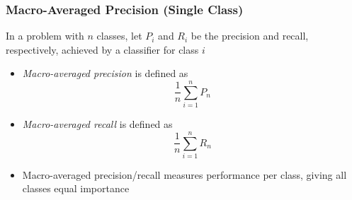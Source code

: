 \documentclass{beamer}
\begin{document}

\begin{frame} \frametitle{Macro-Averaged Precision (Single Class)}
  
  In a problem with $n$ classes, let $P_i$ and $R_i$ be the precision and
  recall, respectively, achieved by a classifier for class $i$
  \begin{itemize}
  \item \emph{Macro-averaged precision} is defined as
    \begin{displaymath}
      \frac{1}{n}\sum_{i=1}^n P_n
    \end{displaymath}
  \item \emph{Macro-averaged recall} is defined as
    \begin{displaymath}
      \frac{1}{n}\sum_{i=1}^n R_n
    \end{displaymath}
  \end{itemize}
  \begin{itemize}
  \item Macro-averaged precision/recall measures performance per class, giving
    all classes equal importance
  \end{itemize}
\end{frame}


\end{document}
